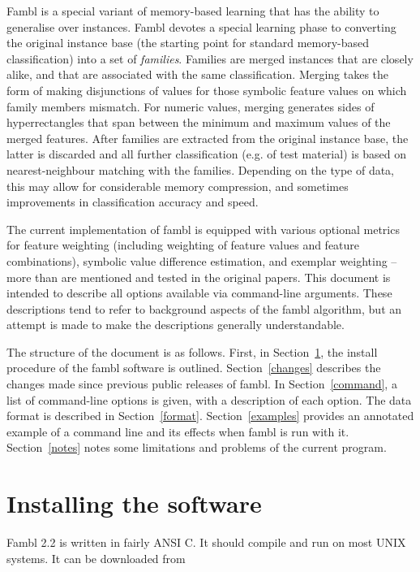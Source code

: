 \documentclass[11pt]{article}
\begin{document}
{\sc Fambl} is a special variant of memory-based learning that has the
ability to generalise over instances. {\sc Fambl} devotes a special
learning phase to converting the original instance base (the starting
point for standard memory-based classification) into a set of {\sl
families}. Families are merged instances that are closely alike, and
that are associated with the same classification. Merging takes the
form of making disjunctions of values for those symbolic feature
values on which family members mismatch. For numeric values, merging
generates sides of hyperrectangles that span between the minimum and
maximum values of the merged features. After families are extracted
from the original instance base, the latter is discarded and all
further classification (e.g. of test material) is based on
nearest-neighbour matching with the families. Depending on the type of
data, this may allow for considerable memory compression, and
sometimes improvements in classification accuracy and speed.

The current implementation of {\sc fambl} is equipped with various
optional metrics for feature weighting (including weighting of feature
values and feature combinations), symbolic value difference
estimation, and exemplar weighting -- more than are mentioned and
tested in the original papers. This document is intended to
describe all options available via command-line arguments. These
descriptions tend to refer to background aspects of the {\sc fambl}
algorithm, but an attempt is made to make the descriptions generally
understandable.

The structure of the document is as follows. First, in
Section~\ref{install}, the install procedure of the {\sc fambl}
software is outlined. Section~\ref{changes} describes the changes made
since previous public releases of {\sc fambl}. In
Section~\ref{command}, a list of command-line options is given, with a
description of each option. The data format is described in
Section~\ref{format}. Section~\ref{examples} provides an annotated
example of a command line and its effects when {\sc fambl} is run with
it.  Section~\ref{notes} notes some limitations and problems of the
current program.

\section{Installing the software}
\label{install}

{\sc Fambl} 2.2 is written in fairly ANSI C.  It should compile and
run on most UNIX systems. It can be downloaded from
\end{document}
